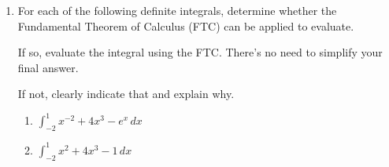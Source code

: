 \documentclass[11pt]{article}
\begin{document}
\begin{enumerate}
\begin{center}
        \begin{tabular}{l c r l c r}
            $\displaystyle\int 8x^2\,dx$ & $=$ & \rule[-8pt]{1.5in}{0.4pt} &
            $\displaystyle\int \dfrac{2}{3x^4} \,dx$ & $=$ & \rule[-8pt]{1.5in}{0.4pt}\\[1in]
            $\displaystyle\int \dfrac{1}{x}+10\,dx$ & $=$ & \rule[-8pt]{1.5in}{0.4pt}&
            $\displaystyle\int 5^x\,dx$ & $=$ & \rule[-8pt]{1.5in}{0.4pt}\\[1in]
            $\displaystyle\int e^x-2 \,dx$ & $=$ & \rule[-8pt]{1.5in}{0.4pt} & 
            $\displaystyle\int \sqrt[7]{x^6} \,dx$ & $=$ & \rule[-8pt]{1.5in}{0.4pt}\\[0.3in]
        \end{tabular}
\end{center}


\newpage


\item For each of the following definite integrals, determine whether the Fundamental Theorem of Calculus (FTC) can be applied to evaluate. 

If so, evaluate the integral using the FTC. There's no need to simplify your final answer.

If not, clearly indicate that and explain why.

\begin{enumerate}
    \item $\displaystyle\int_{-2}^{1}x^{-2}+4x^3-e^x\, dx$

    \vfill

    \item $\displaystyle\int_{-2}^1x^2+4x^3-1\, dx$

    \vfill
\end{enumerate}



\end{enumerate}
\end{document}
